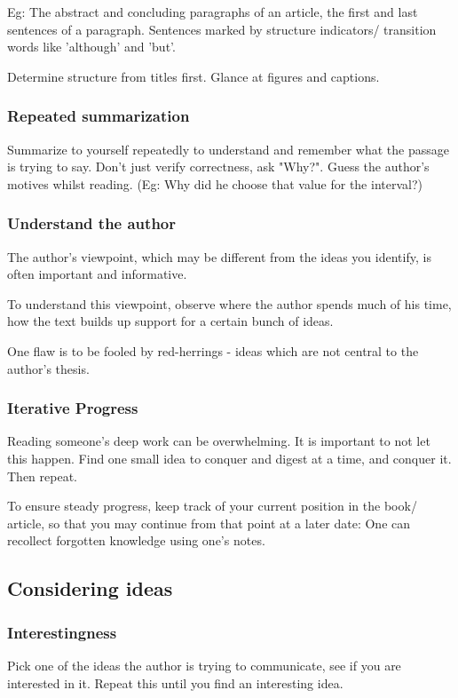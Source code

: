\documentclass[oneside, article]{memoir}
\begin{document}
Eg: The abstract and concluding paragraphs of an article, the first and last sentences of a paragraph. Sentences marked by structure indicators/ transition words like 'although' and 'but'.

Determine structure from titles first. Glance at figures and captions.

\subsubsection{Repeated summarization}
Summarize to yourself repeatedly to understand and remember what the passage is trying to say. Don't just verify correctness, ask "Why?". Guess the author's motives whilst reading. (Eg: Why did he choose that value for the interval?)

\subsubsection{Understand the author}
The author's viewpoint, which may be different from the ideas you identify, is often important and informative.

To understand this viewpoint, observe where the author spends much of his time, how the text builds up support for a certain bunch of ideas.

One flaw is to be fooled by red-herrings - ideas which are not central to the author's thesis.

\subsubsection{Iterative Progress}
Reading someone's deep work can be overwhelming. It is important to not let this happen. Find one small idea to conquer and digest at a time, and conquer it. Then repeat.

To ensure steady progress, keep track of your current position in the book/ article, so that you may continue from that point at a later date: One can recollect forgotten knowledge using one's notes.

\subsection{Considering ideas}
\subsubsection{Interestingness}
Pick one of the ideas the author is trying to communicate, see if you are interested in it. Repeat this until you find an interesting idea.
\end{document}
